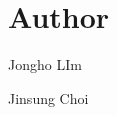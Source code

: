 \hypertarget{index_Author}{}\section{Author}\label{index_Author}

\begin{DoxyItemize}
\item Jongho L\+Im
\item Jinsung Choi 
\end{DoxyItemize}